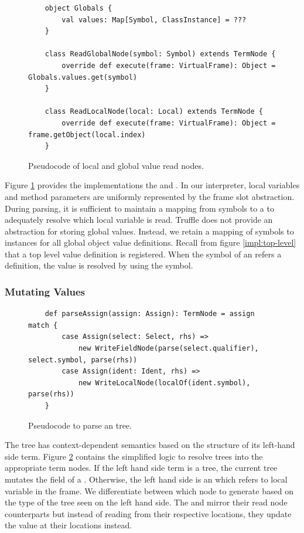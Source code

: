 \begin{figure}[!htb]
	\begin{verbatim}
	object Globals {
		val values: Map[Symbol, ClassInstance] = ???
	}
	
	class ReadGlobalNode(symbol: Symbol) extends TermNode {
		override def execute(frame: VirtualFrame): Object = Globals.values.get(symbol)
	}

	class ReadLocalNode(local: Local) extends TermNode {
		override def execute(frame: VirtualFrame): Object = frame.getObject(local.index)
	}
	\end{verbatim}
	\caption{Pseudocode of local and global value read nodes.}
	\label{impl:local-global-node}
\end{figure}

Figure \ref{impl:local-global-node} provides the implementations the  and .
In our interpreter, local variables and method parameters are uniformly represented by the frame slot abstraction.
During parsing, it is sufficient to maintain a mapping from symbols to a  to adequately resolve which local variable is read.
Truffle does not provide an abstraction for storing global values.
Instead, we retain a mapping of symbols to instances for all global object value definitions.
Recall from figure \ref{impl:top-level} that a top level value definition is registered.
When the symbol of an  refers a  definition, the value is resolved by using the symbol.

\subsubsection*{Mutating Values}

\begin{figure}[!htb]
	\begin{verbatim}
	def parseAssign(assign: Assign): TermNode = assign match {
		case Assign(select: Select, rhs) => 
			new WriteFieldNode(parse(select.qualifier), select.symbol, parse(rhs)) 
		case Assign(ident: Ident, rhs) =>
			new WriteLocalNode(localOf(ident.symbol), parse(rhs)) 
	}
	\end{verbatim}
	\caption{Pseudocode to parse an  tree.}
	\label{impl:parse-assign}
\end{figure}

The  tree has context-dependent semantics based on the structure of its left-hand side term.
Figure \ref{impl:parse-assign} contains the simplified logic to resolve  trees into the appropriate term nodes.
If the left hand side term is a  tree, the current tree mutates the field of a .
Otherwise, the left hand side is an  which refers to local variable in the frame.
We differentiate between which node to generate based on the type of the tree seen on the left hand side.
The  and  mirror their read node counterparts but instead of reading from their respective locations, they update the value at their locations instead.

